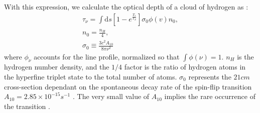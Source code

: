 \documentclass[12pt, TexShade, letterpaper]{report}
\begin{document}

With this expression, we calculate the optical depth of a cloud of hydrogen as \cite{21century, low_frequency}:
\begin{gather}
    \tau_\nu=\int \mathrm{d} s\left[1- e^{ \frac {T_*}{ T_S}}\right] \sigma_0 \phi(v) n_0 ,\\
    n_0 =\frac{n_H}{4},\\
    \sigma_0 \equiv \frac{3c^2 A_{10}}{8\pi \nu^2}
\end{gather}
where $\phi_\nu$ accounts for the line profile, normalized so that $\int \phi \left(\nu\right) =1$. $n_H$ is the hydrogen number density, and the $1/4$ factor is the ratio of hydrogen atoms in the hyperfine triplet state to the total number of atoms. $\sigma_0$ represents the $21cm$ cross-section dependant on the spontaneous decay rate of the spin-flip transition $A_{10} = 2.85 \times 10^{-15} s^{-1}$ \cite{21century, low_frequency}. The very small value of $A_{10}$ implies the rare occurrence of the transition \cite{kit_thesis}. 
\end{document}
